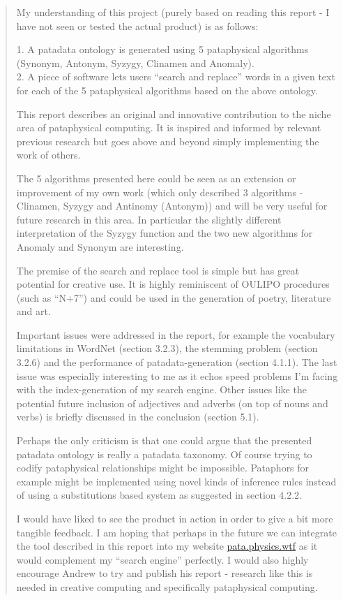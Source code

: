 \begin{quotation}
  My understanding of this project (purely based on reading this report - I have not seen or tested the actual product) is as follows:

  1. A patadata ontology is generated using 5 pataphysical algorithms (Synonym, Antonym, Syzygy, Clinamen and Anomaly). \\
  2. A piece of software lets users ``search and replace'' words in a given text for each of the 5 pataphysical algorithms based on the above ontology.

  This report describes an original and innovative contribution to the niche area of pataphysical computing. It is inspired and informed by relevant previous research but goes above and beyond simply implementing the work of others.

  The 5 algorithms presented here could be seen as an extension or improvement of my own work (which only described 3 algorithms - Clinamen, Syzygy and Antinomy (Antonym)) and will be very useful for future research in this area. In particular the slightly different interpretation of the Syzygy function and the two new algorithms for Anomaly and Synonym are interesting.

  The premise of the search and replace tool is simple but has great potential for creative use. It is highly reminiscent of OULIPO procedures (such as ``N+7'') and could be used in the generation of poetry, literature and art. 

  Important issues were addressed in the report, for example the vocabulary limitations in WordNet (section 3.2.3), the stemming problem (section 3.2.6) and the performance of patadata-generation (section 4.1.1). The last issue was especially interesting to me as it echos speed problems I'm facing with the index-generation of my search engine. Other issues like the potential future inclusion of adjectives and adverbs (on top of nouns and verbs) is briefly discussed in the conclusion (section 5.1).

  Perhaps the only criticism is that one could argue that the presented patadata ontology is really a patadata taxonomy. Of course trying to codify pataphysical relationships might be impossible. Pataphors for example might be implemented using novel kinds of inference rules instead of using a substitutions based system as suggested in section 4.2.2.

  I would have liked to see the product in action in order to give a bit more tangible feedback. I am hoping that perhaps in the future we can integrate the tool described in this report into my website \url{pata.physics.wtf} as it would complement my ``search engine'' perfectly. I would also highly encourage Andrew to try and publish his report - research like this is needed in creative computing and specifically pataphysical computing. 
\end{quotation}

